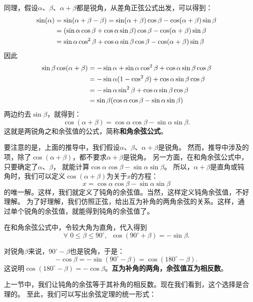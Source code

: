 \documentclass[12pt,UTF8]{ctexbook}
\begin{document}
同理，假设$\alpha$、$\beta$、$\alpha + \beta$都是锐角，从差角正弦公式出发，可以得到：
\begin{align}
      \sin(\alpha) &= \sin(\alpha + \beta - \beta) = \sin (\alpha + \beta) \cos \beta - \cos(\alpha + \beta) \sin\beta \notag \\
      &= (\sin\alpha \cos \beta + \cos \alpha \sin\beta) \cos \beta - \cos(\alpha + \beta) \sin\beta \notag \\
      &= \sin\alpha \cos^2 \beta + \cos \alpha \sin\beta \cos \beta - \cos(\alpha + \beta) \sin\beta \notag 
 \end{align}
因此
\begin{align}
    \sin\beta \cos(\alpha + \beta)  &= -\sin \alpha + \sin\alpha \cos^2 \beta + \cos \alpha \sin\beta \cos \beta \notag \\
    &= -\sin \alpha (1 - \cos^2 \beta) + \cos \alpha \sin\beta \cos \beta \notag \\
    &= -\sin\alpha \sin^2 \beta + \cos \alpha \sin\beta \cos \beta \notag \\
    &= \sin\beta (\cos \alpha \cos \beta - \sin\alpha \sin \beta) \notag
 \end{align}
两边约去$\sin \beta$，就得到：
$$  \cos(\alpha + \beta) = \cos \alpha \cos \beta - \sin\alpha \sin \beta. $$
这就是两锐角之和余弦值的公式，简称\textbf{和角余弦公式}。

要注意的是，上面的推导中，我们假设$\alpha$、$\beta$、$\alpha + \beta$是锐角。
然而，推导中涉及的项，除了$\cos(\alpha + \beta)$，都不要求$\alpha + \beta$是锐角。
另一方面，在和角余弦公式中，只要确定了$\alpha$、$\beta$，
就能计算$\cos \alpha \cos \beta - \sin\alpha \sin \beta$。
所以，$\alpha + \beta$是直角或钝角时，我们可以定义$\cos(\alpha + \beta)$为关于$x$的方程：
$$  x = \cos \alpha \cos \beta - \sin\alpha \sin \beta $$
的唯一解。这样，我们就定义了钝角的余弦值。当然，这样定义钝角余弦值，不好理解。
为了好理解，我们仿照正弦，给出互为补角的两角余弦的关系。这样，通过单个锐角的余弦值，就能得到钝角的余弦值了。

在和角余弦公式中，令较大角为直角，代入得到
$$  \forall \,\, 0 \leqslant \beta \leqslant 90^\circ , \,\,\, \cos(90^\circ + \beta) = - \sin\beta. $$

对锐角$\beta$来说，$90^\circ - \beta$也是锐角，于是：
$$ -\cos \beta = - \sin(90^\circ - \beta) = \cos(180^\circ - \beta). $$
这说明$ \cos(180^\circ - \beta) =  -\cos \beta$。\textbf{互为补角的两角，余弦值互为相反数}。

上一节中，我们让钝角的余弦等于其补角的相反数。现在我们看到，这个选择是合理的。
至此，我们可以写出余弦定理的统一形式：
\end{document}
